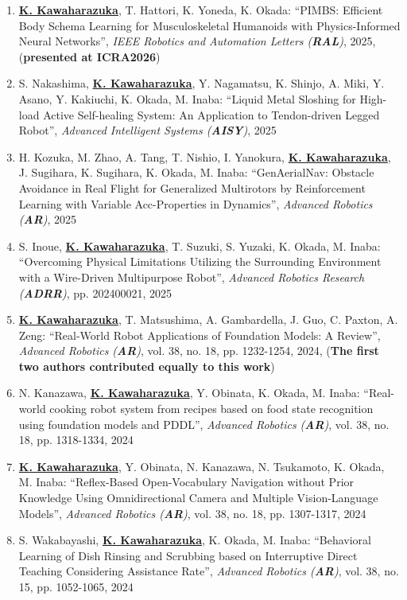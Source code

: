 \documentclass[letterpaper]{article}
\begin{document}
\begin{enumerate}
\item \underline{\textbf{K. Kawaharazuka}}, T. Hattori, K. Yoneda, K. Okada: ``PIMBS: Efficient Body Schema Learning for Musculoskeletal Humanoids with Physics-Informed Neural Networks'', \textit{IEEE Robotics and Automation Letters (\textit{\textbf{RAL}})}, 2025, (\textbf{presented at ICRA2026})
\item S. Nakashima, \underline{\textbf{K. Kawaharazuka}}, Y. Nagamatsu, K. Shinjo, A. Miki, Y. Asano, Y. Kakiuchi, K. Okada, M. Inaba: ``Liquid Metal Sloshing for High-load Active Self-healing System: An Application to Tendon-driven Legged Robot'', \textit{Advanced Intelligent Systems (\textit{\textbf{AISY}})}, 2025
\item H. Kozuka, M. Zhao, A. Tang, T. Nishio, I. Yanokura, \underline{\textbf{K. Kawaharazuka}}, J. Sugihara, K. Sugihara, K. Okada, M. Inaba: ``GenAerialNav: Obstacle Avoidance in Real Flight for Generalized Multirotors by Reinforcement Learning with Variable Acc-Properties in Dynamics'', \textit{Advanced Robotics (\textit{\textbf{AR}})}, 2025
\item S. Inoue, \underline{\textbf{K. Kawaharazuka}}, T. Suzuki, S. Yuzaki, K. Okada, M. Inaba: ``Overcoming Physical Limitations Utilizing the Surrounding Environment with a Wire-Driven Multipurpose Robot'', \textit{Advanced Robotics Research (\textit{\textbf{ADRR}})}, pp. 202400021, 2025
\item \underline{\textbf{K. Kawaharazuka}}, T. Matsushima, A. Gambardella, J. Guo, C. Paxton, A. Zeng: ``Real-World Robot Applications of Foundation Models: A Review'', \textit{Advanced Robotics (\textit{\textbf{AR}})}, vol. 38, no. 18, pp. 1232-1254, 2024, (\textbf{The first two authors contributed equally to this work})
\item N. Kanazawa, \underline{\textbf{K. Kawaharazuka}}, Y. Obinata, K. Okada, M. Inaba: ``Real-world cooking robot system from recipes based on food state recognition using foundation models and PDDL'', \textit{Advanced Robotics (\textit{\textbf{AR}})}, vol. 38, no. 18, pp. 1318-1334, 2024
\item \underline{\textbf{K. Kawaharazuka}}, Y. Obinata, N. Kanazawa, N. Tsukamoto, K. Okada, M. Inaba: ``Reflex-Based Open-Vocabulary Navigation without Prior Knowledge Using Omnidirectional Camera and Multiple Vision-Language Models'', \textit{Advanced Robotics (\textit{\textbf{AR}})}, vol. 38, no. 18, pp. 1307-1317, 2024
\item S. Wakabayashi, \underline{\textbf{K. Kawaharazuka}}, K. Okada, M. Inaba: ``Behavioral Learning of Dish Rinsing and Scrubbing based on Interruptive Direct Teaching Considering Assistance Rate'', \textit{Advanced Robotics (\textit{\textbf{AR}})}, vol. 38, no. 15, pp. 1052-1065, 2024

\end{enumerate}
\end{document}
